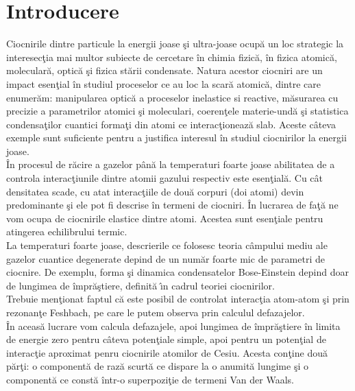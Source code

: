 \chapter{Introducere}

Ciocnirile dintre particule la energii joase \c{s}i ultra-joase ocup\u{a} un loc strategic la interesec\c{t}ia mai multor subiecte de cercetare \^{i}n chimia fizic\u{a}, \^{i}n fizica atomic\u{a}, molecular\u{a}, optic\u{a} \c{s}i  fizica st\u{a}rii condensate. Natura acestor ciocniri are un impact esen\c{t}ial \^{i}n studiul proceselor ce au loc la scar\u{a} atomic\u{a}, dintre care enumer\u{a}m: manipularea optic\u{a} a proceselor inelastice si reactive, m\u{a}surarea cu precizie a parametrilor atomici \c{s}i moleculari, coeren\c{t}ele materie-und\u{a} \c{s}i statistica condensa\c{t}ilor cuantici forma\c{t}i din atomi ce interac\c{t}ioneaz\u{a} slab. Aceste c\^{a}teva exemple sunt suficiente pentru a justifica interesul  \^{i}n studiul ciocnirilor la energii joase.\\


\^{I}n procesul de r\u{a}cire a gazelor p\^{a}n\u{a} la temperaturi foarte joase abilitatea de a controla interac\c{t}iunile dintre atomii gazului respectiv este esen\c{t}ial\u{a}. Cu c\^{a}t densitatea scade, cu atat interac\c{t}iile de dou\u{a} corpuri (doi atomi) devin predominante \c{s}i ele pot fi descrise \^{i}n termeni de ciocniri. \^{I}n lucrarea de fa\c{t}\u{a} ne vom ocupa de ciocnirile elastice dintre atomi. Acestea sunt esen\c{t}iale pentru atingerea echilibrului termic.\\

La temperaturi foarte joase, descrierile ce folosesc  teoria c\^{a}mpului mediu  ale gazelor cuantice degenerate depind de un num\u{a}r foarte mic de parametri de ciocnire. De exemplu, forma \c{s}i dinamica condensatelor Bose-Einstein depind doar de lungimea de \^{i}mpr\u{a}\c{s}tiere, definit\u a \^{\i}n cadrul teoriei ciocnirilor.\\

Trebuie men\c{t}ionat faptul c\u{a} este posibil de controlat interac\c{t}ia atom-atom \c{s}i prin rezonan\c{t}e Feshbach, pe care le putem observa prin calculul defazajelor.\\

\^{I}n aceas\u{a} lucrare vom calcula defazajele, apoi lungimea de \^{i}mpr\u{a}\c{s}tiere \^{i}n limita de energie zero pentru c\^{a}teva poten\c{t}iale simple, apoi pentru un poten\c{t}ial de interac\c{t}ie aproximat penru ciocnirile atomilor de Cesiu. Acesta con\c{t}ine dou\u{a} p\u{a}r\c{t}i: o component\u{a} de raz\u{a} scurt\u{a} ce dispare la o anumit\u{a} lungime \c{s}i o component\u{a} ce const\u{a} \^{i}ntr-o superpozi\c{t}ie de termeni Van der Waals.\\

